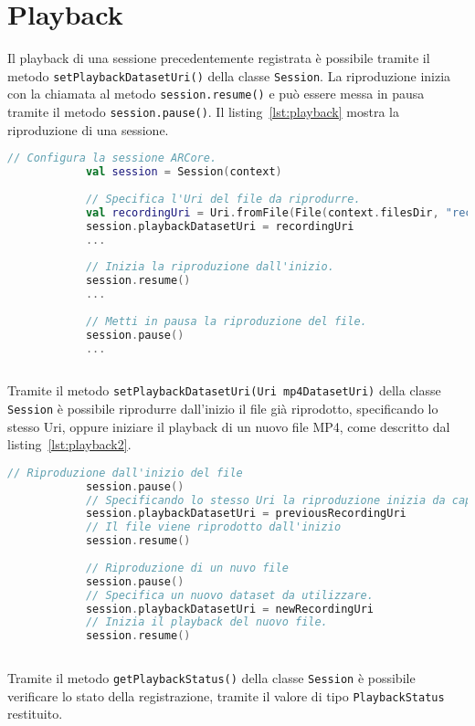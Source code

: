 \documentclass[crop=false, class=book]{standalone}
\begin{document}
	\section{Playback}
	Il playback di una sessione precedentemente registrata è possibile tramite il metodo \verb|setPlaybackDatasetUri()| della classe \verb|Session|. La riproduzione inizia con la chiamata al metodo \verb|session.resume()| e può essere messa in pausa tramite il metodo \verb|session.pause()|. Il listing~\vref{lst:playback} mostra la riproduzione di una sessione.
	\begin{center}
		\begin{minipage}{0.95\textwidth}
			\begin{lstlisting}[caption={Creazione della sessione per il playback.}, label={lst:playback}, language=Kotlin]
			// Configura la sessione ARCore.
			val session = Session(context)
			
			// Specifica l'Uri del file da riprodurre.
			val recordingUri = Uri.fromFile(File(context.filesDir, "recording.mp4"))
			session.playbackDatasetUri = recordingUri
			...
			
			// Inizia la riproduzione dall'inizio.
			session.resume()
			...
			
			// Metti in pausa la riproduzione del file.
			session.pause()
			...
			
			\end{lstlisting}
		\end{minipage}
	\end{center}	
	\noindent
	Tramite il metodo \verb|setPlaybackDatasetUri(Uri mp4DatasetUri)| della classe \verb|Session| è possibile riprodurre dall'inizio il file già riprodotto, specificando lo stesso Uri, oppure iniziare il playback di un nuovo file MP4, come descritto dal listing~\vref{lst:playback2}.
	\begin{center}
		\begin{minipage}{0.95\textwidth}
			\begin{lstlisting}[caption={Esempi di utilizzo del playback.}, label={lst:playback2}, language=Kotlin]
			// Riproduzione dall'inizio del file
			session.pause()
			// Specificando lo stesso Uri la riproduzione inizia da capo.
			session.playbackDatasetUri = previousRecordingUri
			// Il file viene riprodotto dall'inizio
			session.resume() 
			
			// Riproduzione di un nuvo file
			session.pause()   
			// Specifica un nuovo dataset da utilizzare.
			session.playbackDatasetUri = newRecordingUri
			// Inizia il playback del nuovo file.
			session.resume()  
				
			\end{lstlisting}
		\end{minipage}
	\end{center}	
	\noindent
	Tramite il metodo \verb|getPlaybackStatus()| della classe \verb|Session| è possibile verificare lo stato della registrazione, tramite il valore di tipo \verb|PlaybackStatus| restituito.
	
\end{document}
